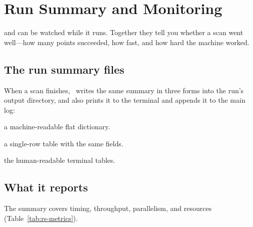 \chapter{Run Summary and Monitoring}
\label{ch:run-summary}

 and can be watched while it runs. Together they tell you
whether a scan went well---how many points succeeded, how fast, and how hard the machine worked.

\section{The run summary files}
\label{sec:rs-files}

When a scan finishes, \Jarvis\ writes the same summary in three forms into the run's output
directory, and also prints it to the terminal and appends it to the main log:

\begin{description}[style=nextline, leftmargin=1.2em]
  \item[\file{run\_summary.json}] a machine-readable flat dictionary.
  \item[\file{run\_summary.csv}] a single-row table with the same fields.
  \item[\file{run\_summary.txt}] the human-readable terminal tables.
\end{description}

\section{What it reports}
\label{sec:rs-metrics}

The summary covers timing, throughput, parallelism, and resources
(Table~\ref{tab:rs-metrics}).

